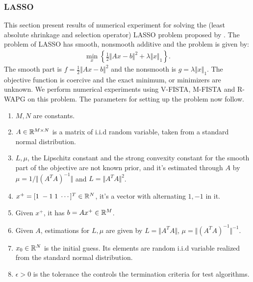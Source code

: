 \documentclass[12pt]{article}
\begin{document}
    \subsubsection{LASSO}
        This section present results of numerical experiment for solving the (least absolute shrinkage and
        selection operator) LASSO problem proposed by 
         \cite{tibshirani_regression_1996}. 
        The problem of LASSO has smooth, nonsmooth additive and the problem is given by: 
        \begin{align*}
            \min_x
            \left\lbrace
                \frac{1}{2}\Vert Ax - b\Vert^2 + \lambda\Vert x\Vert_1
            \right\rbrace. 
        \end{align*}
        The smooth part is $f =\frac{1}{2}\Vert Ax - b\Vert^2$ and the nonsmooth is $g = \lambda\Vert x\Vert_1$. 
        The objective function is coercive and the exact minimum, or minimizers are unknown. 
        We perform numerical experiments using V-FISTA, M-FISTA and R-WAPG on this problem. 
        The parameters for setting up the problem now follow. 
        \begin{enumerate}
            \item $M, N$ are constants. 
            \item $A \in \mathbb R^{M\times N}$ is a matrix of i.i.d random variable, taken from a standard normal distribution. 
            \item $L, \mu$, the Lipschitz constant and the strong convexity constant for the smooth part of the objective are not known prior, and it's estimated through $A$ by $\mu = 1/\Vert (A^TA)^{-1}\Vert$ and $L = \Vert A^TA\Vert^2$. 
            \item $x^+ = [1\; -1\; 1 \; \cdots ]^T \in \mathbb R^N$, it's a vector with alternating $1, -1$ in it. 
            \item Given $x^+$, it has $b = Ax^+ \in \mathbb R^M$. 
            \item Given $A$, estimations for $L,\mu$ are given by $L = \Vert A^TA\Vert$, $\mu = \Vert (A^TA)^{-1}\Vert^{-1}$. 
            \item $x_0\in \mathbb R^N$ is the initial guess. Its elements are random i.i.d variable realized from the standard normal distribution. 
            \item $\epsilon > 0$ is the tolerance the controls the termination criteria for test algorithms. 
        \end{enumerate}
\end{document}
